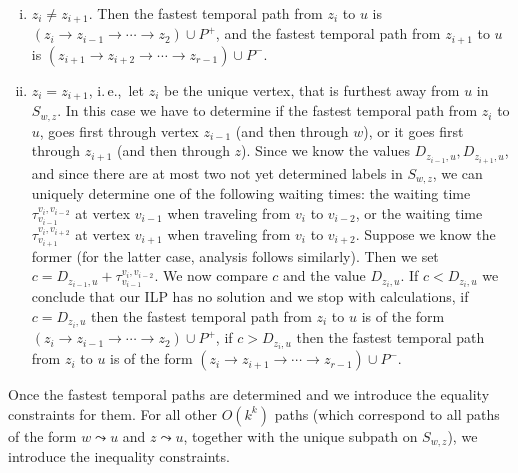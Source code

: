 \documentclass[a4paper,UKenglish,cleveref, autoref, thm-restate]{lipics-v2021}
\newcommand{\ie}{i.\,e.,\ }
\begin{document}
\begin{enumerate}[(i)]
    \item \label{FPT:equality-fromUtoX-twosplit}
    $z_i \neq z_{i+1}$.
    Then the fastest temporal path from $z_i$ to $u$ is 
    $(z_i \rightarrow z_{i-1} \rightarrow \cdots \rightarrow z_2) \cup P^+$,
    and 
    the fastest temporal path from $z_{i+1}$ to $u$ is 
    $(z_{i+1} \rightarrow z_{i+2} \rightarrow \cdots \rightarrow z_{r-1}) \cup P^-$.
    \item \label{FPT:equality-fromUtoX-onesplit}
    $z_i = z_{i+1}$, \ie let $z_i$ be the unique vertex, that is furthest away from $u$ in $S_{w,z}$.
    In this case we have to determine if the fastest temporal path from $z_i$ to $u$, goes first through vertex $z_{i-1}$ (and then through $w$),
    or it goes first through $z_{i+1}$ (and then through $z$).
    Since we know the values $D_{z_{i-1},u}, D_{z_{i+1},u}$,
    and since there are at most two not yet determined labels in $S_{w,z}$,
    we can uniquely determine one of the following
    waiting times:
    the waiting time $\tau_{v_{i-1}} ^{v_{i}, v_{i-2}}$ at vertex $v_{i-1}$ when traveling from $v_i$ to $v_{i-2}$,
    or
    the waiting time $\tau_{v_{i+1}} ^{v_{i}, v_{i+2}}$ at vertex $v_{i+1}$ when traveling from $v_i$ to $v_{i+2}$.
    Suppose we know the former (for the latter case, analysis follows similarly).
    Then we set $c = D_{z_{i-1},u} +  \tau_{v_{i-1}} ^{v_{i}, v_{i-2}}$.
    We now compare $c$ and the value $D_{z_{i},u}$.
    If $c < D_{z_{i},u}$ we conclude that our ILP has no solution and we stop with calculations,
    if $c = D_{z_{i},u}$ then the fastest temporal path from $z_i$ to $u$ is of the form $(z_i \rightarrow z_{i-1} \rightarrow \cdots \rightarrow z_2) \cup P^+$,
    if $c > D_{z_{i},u}$ then the fastest temporal path from $z_i$ to $u$ is of the form $(z_i \rightarrow z_{i+1} \rightarrow \cdots \rightarrow z_{r-1}) \cup P^-$.
\end{enumerate}
Once the fastest temporal paths are determined and we introduce the equality constraints for them.
For all other $O(k^k)$ paths (which correspond to all paths of the form $w \leadsto u$ and $z \leadsto u$, together with the unique subpath on $S_{w,z}$),
we introduce the inequality constraints.
\end{document}
